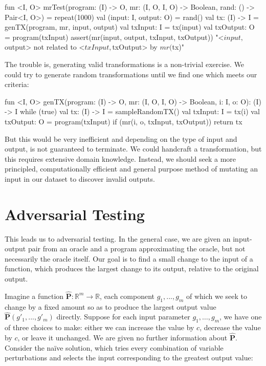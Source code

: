 \documentclass[12pt,initial,twoside,maitrise]{dms}
\numberwithin{equation}{section}
\numberwithin{table}{chapter}
\numberwithin{figure}{chapter}
\begin{document}
\begin{kotlinlisting}
fun <I, O> mrTest(program: (I) -> O, mr: (I, O, I, O) -> Boolean, rand: () -> Pair<I, O>) =
    repeat(1000) {
        val (input: I, output: O) = rand()
        val tx: (I) -> I = genTX(program, mr, input, output)
        val txInput: I = tx(input)
        val txOutput: O = program(txInput)
        assert(mr(input, output, txInput, txOutput)) {
            "<$input, $output> not related to <$txInput, $txOutput> by $mr ($tx)"
        }
    }
\end{kotlinlisting}
%
The trouble is, generating valid transformations is a non-trivial exercise. We could try to generate random transformations until we find one which meets our criteria:
%
\begin{kotlinlisting}
fun <I, O> genTX(program: (I) -> O, mr: (I, O, I, O) -> Boolean, i: I, o: O): (I) -> I {
    while (true) {
        val tx: (I) -> I = sampleRandomTX()
        val txInput: I = tx(i)
        val txOutput: O = program(txInput)
        if (mr(i, o, txInput, txOutput)) return tx
    }
}
\end{kotlinlisting}

But this would be very inefficient and depending on the type of input and output, is not guaranteed to terminate. We could handcraft a transformation, but this requires extensive domain knowledge. Instead, we should seek a more principled, computationally efficient and general purpose method of mutating an input in our dataset to discover invalid outputs.

\section{Adversarial Testing}

This leads us to adversarial testing. In the general case, we are given an input-output pair from an oracle and a program approximating the oracle, but not necessarily the oracle itself. Our goal is to find a small change to the input of a function, which produces the largest change to its output, relative to the original output.

Imagine a function $\mathbf{\hat P}: \mathbb R^m \rightarrow \mathbb R$, each component $g_1, ..., g_{m}$ of which we seek to change by a fixed amount so as to produce the largest output value $\mathbf{\hat P}(g'_1, ..., g'_{m})$ directly. Suppose for each input parameter $g_1, \ldots, g_{m}$, we have one of three choices to make: either we can increase the value by $c$, decrease the value by $c$, or leave it unchanged. We are given no further information about $\mathbf{\hat P}$. Consider the na\"ive solution, which tries every combination of variable perturbations and selects the input corresponding to the greatest output value:
\end{document}
